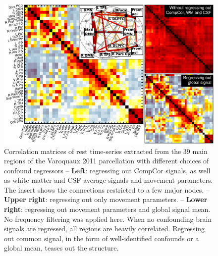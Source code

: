 \documentclass[5p]{elsarticle}
\begin{document}
\begin{figure}
\includegraphics[width=\linewidth]{pg_0002}%

\caption{
Correlation matrices of rest time-series extracted from the 39 main
regions of the Varoquaux 2011 \cite{varoquaux2011} parcellation with
different choices of confound regressors -- 
\textbf{Left}: regressing out CompCor signals, as well as white matter and
CSF average signals and movement parameters. The insert shows the
connections restricted to a few major nodes.
-- \textbf{Upper right}: regressing out only movement parameters. -- 
\textbf{Lower right}:
regressing out movement parameters and global signal mean.
No frequency filtering was applied here.
\label{fig:correlation_matrices}
When no confounding brain signals are regressed, all regions are heavily
correlated. Regressing out common signal, in the form of well-identified
confounds or a global mean, teases out the structure.
}
\end{figure}
\end{document}
